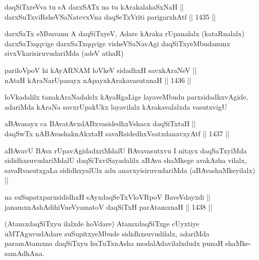 \begin{shl}
daqSiTxreVva tu sA darxSATx na tu kArakalakaSxNaH || \\
darxSuTxviRsheVSaNatevxVna daqSeTxVriti parigarxhAtf ||  1435 ||  
\end{shl}

\begin{artha}
darxSaTx eMbuvanu A daqSiTxyeV, Adare kAraka rUpanalalx (kataRnalalx) darxSaTxqqvige darxSaTxqqvige visheVSaNavAgi daqSiTxyeMbudanunx sivxVkarisiruvudariMda (adeV athaR)
\end{artha}


\begin{shl}
pariloVpoV hi kAyARNAM loVkeV sidadhxH savxkAraNeV || \\
nAtaH kAraNarUpasayx nApayxkArakavasutxnaH ||  1436 ||  
\end{shl}

\begin{artha}
loVkadalilx tanakAraNadalelx kAyaRgaLige layaveMbudu parxsidadhxvAgide, adariMda kAraNa savxrUpakUkx layavilalx kArakavalalxda vasutxvigU
\end{artha}


\begin{shl}
aBAvasayx ca BAvatAvxdABxvasidedhxVshacx daqSiTxtaH || \\
daqSwTx nABAvashaknAkx\s taH savaRsidedhxVsatxdanavxyAtf ||  1437 ||  
\end{shl}

\begin{artha}
aBAvavU BAva rUpavAgidadxriMdalU BAvavasutxvu I nitayx daqSaTxyiMda sididhxsuvudariMdalU daqSiTxviSayadalilx aBAva shaMkege avakAsha vilalx, savaRvasutxgaLa sididhxyalUlx adu anavxyisiruvudariMda (aBAvashaMkeyilalx) ||
\end{artha}


\begin{shl}
na suSupatxparxsididhxH sAyxdaqSeTxVloVRpoV BaveVdayxdi || \\
janamxnAshAdihiVneVyamatoV daqSiTxH parAtamxnaH ||  1438 ||  
\end{shl}

\begin{artha}
(AtamxdaqSiTxyu ilalxde hoVdare) AtamxdaqSiTxge cUyxtiye uMTAguvudAdare suSupitxyeMbude sididhxsuvudilalx, adariMda paramAtamxna daqSiTxyu huTuTxnAsha modalAdavilalxdudx punaH shaMke- samAdhAna.
\end{artha}

